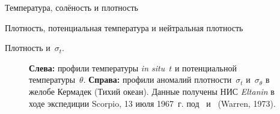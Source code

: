 \begin{chapter}{Температура, солёность и плотность}
\begin{section}{Плотность, потенциальная температура и нейтральная плотность}
\begin{paragraph}{Плотность и~$\sigma_t$.}
\begin{figure}[t!]
\caption{\textbf{Слева:} профили температуры \textit{in situ}~$t$ и 
потенциальной температуры~$\theta$. \textbf{Справа:} профили аномалий
плотности~$\sigma_t$ и~$\sigma_\theta$ в желобе Кермадек (Тихий океан).
Данные получены НИС \textit{Eltanin} в ходе экспедиции Scorpio,
13 июля 1967~г. под~ и~
(Warren, 1973).}
\label{fig:thetaprofile}
\end{figure}
%
\end{paragraph}


\end{section}
\end{chapter}
